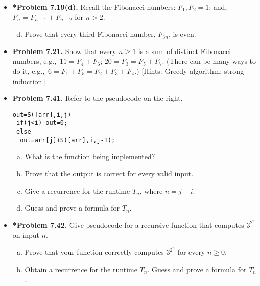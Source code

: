 \documentclass[11pt]{article}
\begin{document}
\begin{itemize}
\vspace{0.1in}

\item \textbf{*Problem 7.19(d).}
Recall the Fibonacci numbers: $F_1,F_2=1$; and, $F_n=F_{n-1}+F_{n-2}$ for $n>2$.
\begin{enumerate}[(a)]
\setcounter{enumi}{3}
\item Prove that every third Fibonacci number, $F_{3n}$, is even.
\end{enumerate}

\vspace{0.1in}

\item \textbf{Problem 7.21.}
Show that every $n\ge 1$ is a sum of distinct Fibonacci numbers,
e.g.,~$11=F_4+F_6$; $20=F_3=F_5+F_7$.
(There can be many ways to do it, e.g.,~$6=F_1+F_5=F_2+F_3+F_4$.)
[Hints: Greedy algorithm; strong induction.]

\vspace{0.1in}

\item \textbf{Problem 7.41.}
Refer to the pseudocode on the right.
\begin{verbatim}
out=S([arr],i,j)
 if(j<i) out=0;
 else
  out=arr[j]+S([arr],i,j-1);
\end{verbatim}
\begin{enumerate}[(a)]
\item What is the function being implemented?
\item Prove that the output is correct for every valid input.
\item Give a recurrence for the runtime $T_n$, where $n=j-i$.
\item Guess and prove a formula for $T_n$.
\end{enumerate}

\vspace{0.1in}

\item \textbf{*Problem 7.42.}
Give pseudocode for a recursive function that computes $3^{2^n}$ on input $n$.
\begin{enumerate}[(a)]
\item Prove that your function correctly computes $3^{2^n}$ for every $n\ge 0$.
\item Obtain a recurrence for the runtime $T_n$.
  Guess and prove a formula for $T_n$.
\end{enumerate}

\vspace{0.1in}


\end{itemize}
\end{document}
